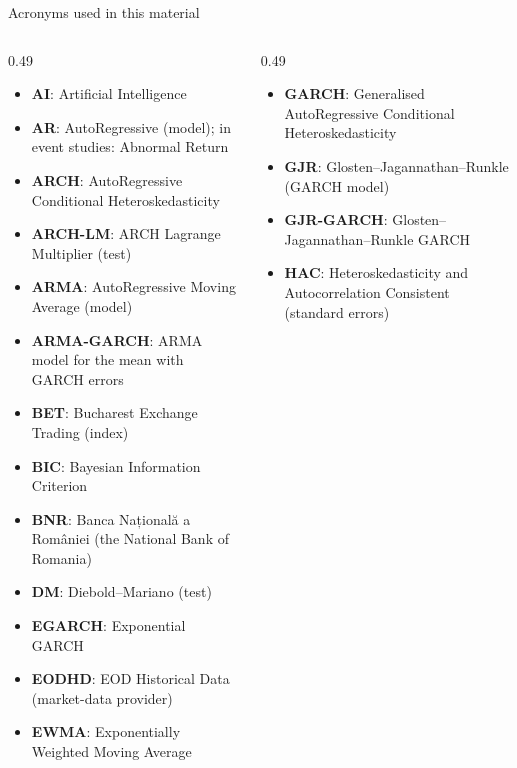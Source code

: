 {
\begin{frame}[noframenumbering]
    \titlepage
\end{frame}
}
\begin{frame}{Acronyms used in this material}
\begin{columns}[T]
\begin{column}{0.49\textwidth}
\begin{itemize}\setlength{\itemsep}{0pt}
    \item \textbf{AI}: Artificial Intelligence
    \item \textbf{AR}: AutoRegressive (model); in event studies: Abnormal Return
    \item \textbf{ARCH}: AutoRegressive Conditional Heteroskedasticity
    \item \textbf{ARCH-LM}: ARCH Lagrange Multiplier (test)
    \item \textbf{ARMA}: AutoRegressive Moving Average (model)
    \item \textbf{ARMA-GARCH}: ARMA model for the mean with GARCH errors
    \item \textbf{BET}: Bucharest Exchange Trading (index)
    \item \textbf{BIC}: Bayesian Information Criterion
    \item \textbf{BNR}: Banca Națională a României (the National Bank of Romania)
    \item \textbf{DM}: Diebold–Mariano (test)
    \item \textbf{EGARCH}: Exponential GARCH
    \item \textbf{EODHD}: EOD Historical Data (market-data provider)
    \item \textbf{EWMA}: Exponentially Weighted Moving Average
\end{itemize}
\end{column}
\begin{column}{0.49\textwidth}
\begin{itemize}\setlength{\itemsep}{0pt}
    \item \textbf{GARCH}: Generalised AutoRegressive Conditional Heteroskedasticity
    \item \textbf{GJR}: Glosten–Jagannathan–Runkle (GARCH model)
    \item \textbf{GJR-GARCH}: Glosten–Jagannathan–Runkle GARCH
    \item \textbf{HAC}: Heteroskedasticity and Autocorrelation Consistent (standard errors)

\end{itemize}
\end{column}
\end{columns}
\end{frame}
